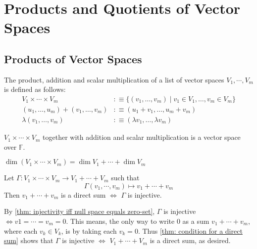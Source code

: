 \section{Products and Quotients of Vector Spaces}
\subsection{Products of Vector Spaces}

\setcounter{thm}{86}
\begin{mydef} 
  The product, addition and scalar multiplication of a list of vector spaces $V_1, \cdots, V_m$ is defined as follows: 
  \begin{equation}
    \begin{aligned}
      V_1 \times \cdots \times V_m &:\equiv \{ (v_1, \dots, v_m) \mid v_1 \in V_1, \dots, v_m \in V_m\} \\
      (u_1, \dots, u_m) + (v_1, \dots, v_m) &:\equiv (u_1+v_1, \dots, u_m+v_m) \\
      \lambda (v_1, \dots, v_m) &:\equiv (\lambda v_1, \dots, \lambda v_m)
    \end{aligned}
  \end{equation}
\end{mydef}

\setcounter{thm}{88}
\begin{thm} 
  $V_1 \times \cdots \times V_m$ together with addition and scalar multiplication is a vector space over $\mathbb{F}$.
\end{thm}

\setcounter{thm}{91}
\begin{thm} 
  $\dim (V_1 \times \cdots \times V_m) = \dim V_1 + \cdots + \dim V_m$
\end{thm}

\begin{thm}
  Let $\Gamma: V_1 \times \cdots \times V_m \to V_1 + \cdots + V_m$ such that
  \begin{equation}
    \Gamma(v_1, \cdots, v_m) \mapsto v_1 + \cdots + v_m
  \end{equation}
  Then $v_1 + \cdots + v_m$ is a direct sum $\iff$ $\Gamma$ is injective.
\end{thm}
\begin{prf}
  By \ref{thm: injectivity iff null space equals zero-set}, $\Gamma$ is injective $\iff v1 = \cdots = v_m = 0$. This means, the only way to write $0$ as a sum $v_1 + \cdots + v_m$, where each $v_k \in V_k$, is by taking each $v_k=0$. Thus \ref{thm: condition for a direct sum} shows that $\Gamma$ is injective $\iff$ $V_1 + \cdots + V_m$ is a direct sum, as desired.
\end{prf}

